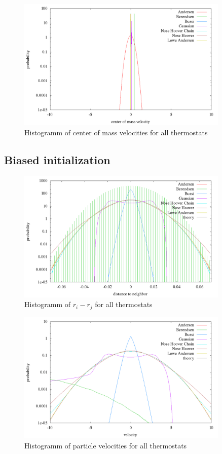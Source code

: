 \begin{figure}[H]
\centering
\includegraphics[width=0.9\textwidth]{./graphics/Histogramm_schwerVel_rand_T=20_p=64.png}
\caption{Histogramm of center of mass velocities for all thermostats}
\label{im:schwerVel_rand}
\end{figure} 


\subsection{Biased initialization}
\begin{figure}[H]
\centering
\includegraphics[width=0.9\textwidth]{./graphics/Histogramm_relPos_one_T=20_p=64.png}
\caption{Histogramm of $r_i - r_j$ for all thermostats}
\label{im:relPos_one}
\end{figure} 

\begin{figure}[H]
\centering
\includegraphics[width=0.9\textwidth]{./graphics/Histogramm_velocity_one_T=20_p=64.png}
\caption{Histogramm of particle velocities for all thermostats}
\label{im:vel_one}
\end{figure}

